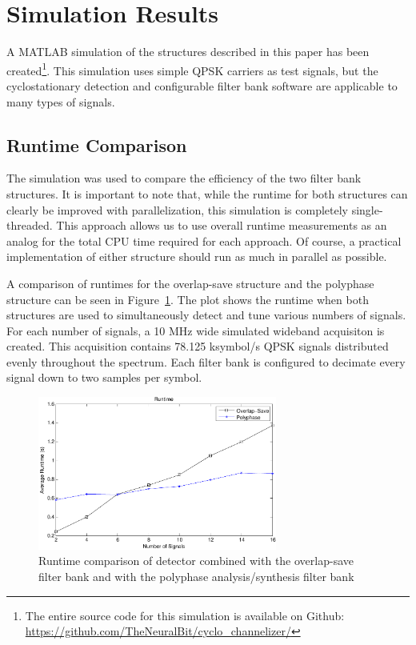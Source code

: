 \documentclass[12pt]{article}
\begin{document}
\section{Simulation Results}
\label{sec:sim}

A MATLAB simulation of the structures described in this paper has been
created\footnote{The entire source code for this simulation is available on
Github: \url{https://github.com/TheNeuralBit/cyclo_channelizer/}}. This
simulation uses simple QPSK carriers as test signals, but the cyclostationary
detection and configurable filter bank software are applicable to many types of
signals.

\subsection{Runtime Comparison}
\label{sec:sim_runtime}

The simulation was used to compare the efficiency of the two filter bank
structures. It is important to note that, while the runtime for both structures
can clearly be improved with parallelization, this simulation is completely
single-threaded. This approach allows us to use overall runtime measurements as
an analog for the total CPU time required for each approach. Of course,
a practical implementation of either structure should run as much in parallel
as possible.

A comparison of runtimes for the overlap-save structure and the polyphase
structure can be seen in Figure~\ref{fig:block_diagram}. The plot shows the
runtime when both structures are used to simultaneously detect and tune various
numbers of signals. For each number of signals, a 10 MHz wide simulated
wideband acquisiton is created. This acquisition contains 78.125 ksymbol/s QPSK
signals distributed evenly throughout the spectrum. Each filter bank is
configured to decimate every signal down to two samples per symbol.

\begin{figure}[h!]
    \begin{center}
    \includegraphics[width=0.7\textwidth]{runtime_comparison_250}%
    \end{center}
    \caption{Runtime comparison of detector combined with the overlap-save
             filter bank and with the polyphase analysis/synthesis filter bank}
    \label{fig:block_diagram}
\end{figure}
\end{document}
